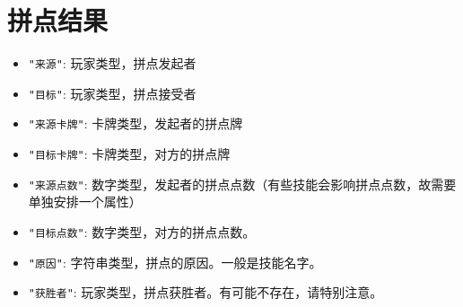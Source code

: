 \section{拼点结果}
\begin{itemize}
 \item \verb|"来源"|: 玩家类型，拼点发起者
 \item \verb|"目标"|: 玩家类型，拼点接受者
 \item \verb|"来源卡牌"|: 卡牌类型，发起者的拼点牌
 \item \verb|"目标卡牌"|: 卡牌类型，对方的拼点牌
 \item \verb|"来源点数"|: 数字类型，发起者的拼点点数（有些技能会影响拼点点数，故需要单独安排一个属性）
 \item \verb|"目标点数"|: 数字类型，对方的拼点点数。
 \item \verb|"原因"|: 字符串类型，拼点的原因。一般是技能名字。
 \item \verb|"获胜者"|: 玩家类型，拼点获胜者。有可能不存在，请特别注意。
\end{itemize}
